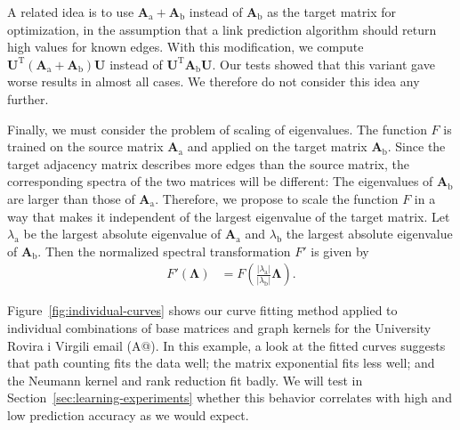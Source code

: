 \documentclass[11pt,a4paper]{book}
\begin{document}
A related idea is to use $\mathbf A_{\mathrm a}+\mathbf A_{\mathrm b}$
instead of $\mathbf 
A_{\mathrm b}$ as the target matrix for optimization, 
in the assumption that a link prediction algorithm should
return high values for known edges.  With this modification, we compute
$\mathbf U^{\mathrm T}(\mathbf A_{\mathrm a} + \mathbf A_{\mathrm
  b})\mathbf U$ instead of 
$\mathbf U^{\mathrm T} \mathbf A_{\mathrm b} \mathbf U$.  Our tests showed that
this variant gave worse results in almost all cases.  We therefore do
not consider this idea any further. 

Finally, we must consider the problem of scaling of eigenvalues.  
The function $F$ is trained on the source matrix $\mathbf A_{\mathrm a}$ and
applied on the target matrix $\mathbf A_{\mathrm b}$.
Since the target adjacency matrix describes more edges than the source
matrix, the corresponding spectra of the two matrices will be different:
The eigenvalues of $\mathbf A_{\mathrm b}$ are
larger than those of $\mathbf A_{\mathrm a}$. Therefore, we propose to
scale the function $F$ in a way that makes it independent of the largest
eigenvalue of the target matrix.  Let $\lambda_{\mathrm a}$ be the
largest absolute eigenvalue of $\mathbf A_{\mathrm a}$ and
$\lambda_{\mathrm b}$ the largest absolute eigenvalue of
$\mathbf A_{\mathrm b}$.  Then the normalized
spectral transformation $F'$ is given by
\begin{align}
  F'(\mathbf \Lambda) &= F\left(\frac {|\lambda_{\mathrm
      a}|}{|\lambda_{\mathrm b}|} \mathbf \Lambda\right).
\end{align}

Figure~\ref{fig:individual-curves} shows our curve fitting method
applied to individual combinations of base matrices and graph kernels for
the University Rovira i Virgili email (\textsf{A@}).  
In this example, a look at the fitted curves suggests that path
counting fits the data well; the matrix exponential fits less well; and
the Neumann kernel and rank reduction fit badly.  We will test in
Section~\ref{sec:learning-experiments} whether this behavior correlates
with high and low prediction accuracy as we would expect. 
\end{document}
